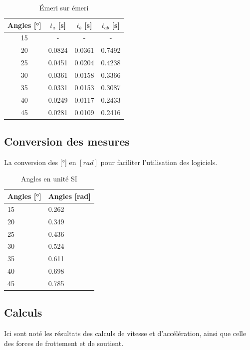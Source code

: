 \documentclass[twoside,twocolumn]{article}
\begin{document}
\begin{table}[H]
\caption{Émeri sur émeri}
\begin{tabular}{|c|c|c|c|}
\hline 
Angles [°] & $t_a$ [s] & $t_b$ [s] & $t_{ab}$ [s] \\
\hline \hline
15 & - & - & - \\
\hline
20 & 0.0824 & 0.0361 & 0.7492 \\
\hline
25 & 0.0451 & 0.0204 & 0.4238 \\
\hline
30 & 0.0361 & 0.0158 & 0.3366 \\
\hline
35 & 0.0331 & 0.0153 & 0.3087 \\
\hline
40 & 0.0249 & 0.0117 & 0.2433 \\
\hline
45 & 0.0281 & 0.0109 & 0.2416 \\
\hline
\end{tabular}
\label{table:mesureee}

\end{table}

\subsection{Conversion des mesures}
La conversion des [°] en $[rad]$ pour faciliter l'utilisation des logiciels.
\begin{table}[H]
\centering
\caption{Angles en unité SI}
\begin{tabular}{|l|l|}
\hline
Angles [°] & Angles [rad] \\
\hline \hline
15 & 0.262 \\
\hline
20 & 0.349 \\
\hline
25 & 0.436 \\
\hline
30 & 0.524 \\
\hline
35 & 0.611 \\
\hline
40 & 0.698 \\
\hline
45 & 0.785 \\
\hline
\end{tabular}
\label{table:angle}
\end{table}

\subsection{Calculs}
Ici sont noté les résultats des calculs de vitesse et d'accélération, ainsi que celle des forces de frottement et de soutient.
\end{document}
